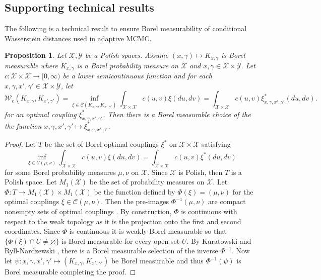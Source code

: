 \documentclass[12pt]{article}
\theoremstyle{plain}
\newtheorem{proposition}[theorem]{Proposition}
\theoremstyle{remark}
\newcommand{\W}{\mathcal{W}}
\newcommand{\X}{\mathcal{X}}
\newcommand{\Y}{\mathcal{Y}}
\newcommand{\C}{\mathcal{C}}
\begin{document}
\begin{appendix}

\section*{Supporting technical results}

The following is a technical result to ensure Borel measurability of conditional Wasserstein distances used in adaptive MCMC.

\begin{proposition}
\label{prop:measurable_selection}
Let $\X, \Y$ be a Polish spaces.
Assume $(x, \gamma) \mapsto K_{x, \gamma}$ is Borel measurable where $K_{x, \gamma}$ is a Borel probability measure on $\X$ and $x, \gamma \in \X \times \Y$.
Let $c : \X \times \X \to [0, \infty)$ be a lower semicontinuous function and for each $x, \gamma, x', \gamma' \in \X \times \Y$, let
\[
\W_{c}\left( K_{x, \gamma}, K_{x', \gamma'} \right)
= \inf_{\xi \in \C\left( K_{x, \gamma}, K_{x', \gamma'} \right) } \int_{\X \times \X} c(u, v) \xi(du, dv)
= \int_{\X \times \X} c(u, v) \xi^*_{x, \gamma, x', \gamma'}(du, dv).
\]
for an optimal coupling $\xi^*_{x, \gamma, x', \gamma'}$.
Then there is a Borel measurable choice of the the function $x, \gamma, x', \gamma' \mapsto \xi^*_{x, \gamma, x', \gamma'}$.
\end{proposition}

\begin{proof}
Let $T$ be the set of Borel optimal couplings $\xi^*$ on $\X \times \X$ satisfying
\[
\inf_{ \xi \in \C\left( \mu, \nu \right) } \int_{\X \times \X} c(u, v) \xi(du, dv)
= \int_{\X \times \X} c(u, v) \xi^*(du, dv)
\]
for some Borel probability measures $\mu, \nu$ on $\X$.
Since $\X$ is Polish, then $T$ is a Polish space.
Let $M_1(\X)$ be the set of probability measures on $\X$.
Let $\Phi : T \to M_1(\X) \times M_1(\X)$ be the function defined by $\Phi(\xi) = (\mu, \nu)$ for the optimal couplings $\xi \in \C\left( \mu, \nu \right)$.
Then the pre-images $\Phi^{-1}(\mu, \nu)$ are compact nonempty sets of optimal couplings \citep[Corollary 5.21]{villani:2008}.
By construction, $\Phi$ is continuous with respect to the weak topology as it is the projection onto the first and second coordinates.
Since $\Phi$ is continuous it is weakly Borel measurable so that $\{ \Phi(\xi) \cap U \not= \varnothing \}$ is Borel measurable for every open set $U$.
By Kuratowski and Ryll-Nardzewski \citep{kuratowski:1965}, there is a Borel measurable selection of the inverse $\Phi^{-1}$.
Now let $\psi : x, \gamma, x', \gamma' \mapsto ( K_{x, \gamma}, K_{x', \gamma'} )$ be Borel measurable and thus $\Phi^{-1}( \psi )$ is Borel measurable completing the proof.
\end{proof}


\end{appendix}
\end{document}
